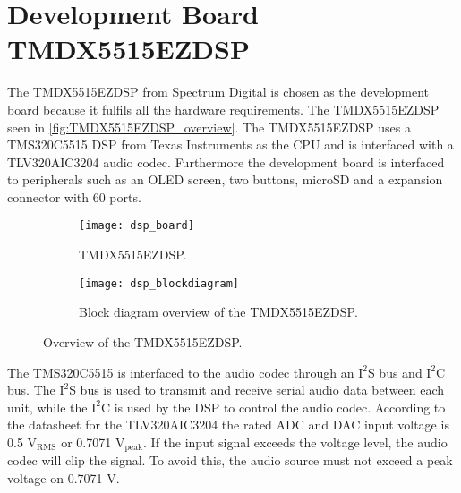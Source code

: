 \section{Development Board TMDX5515EZDSP}

The TMDX5515EZDSP from Spectrum Digital is chosen as the development board because it fulfils all the hardware requirements. The TMDX5515EZDSP seen in \autoref{fig:TMDX5515EZDSP_overview}. The TMDX5515EZDSP uses a TMS320C5515 DSP from Texas Instruments as the CPU and is interfaced with a TLV320AIC3204 audio codec. Furthermore the development board is interfaced to peripherals such as an OLED screen, two buttons, microSD and a expansion connector with 60 ports. 

\begin{figure}[H]
\centering
\begin{subfigure}[t]{0.47\textwidth}
\texttt{[image: dsp\_board]}
	\caption{TMDX5515EZDSP.}
	\label{fig:TMDX5515EZDSP}
\end{subfigure}
\hspace{6mm} 
\begin{subfigure}[t]{0.35\textwidth}
\texttt{[image: dsp\_blockdiagram]}
	\caption{Block diagram overview of the TMDX5515EZDSP.}
	\label{fig:TMDX5515EZDSP_blockdiagram}
\end{subfigure}
\caption{Overview of the TMDX5515EZDSP.}
\label{fig:TMDX5515EZDSP_overview}
\end{figure}

The TMS320C5515 is interfaced to the audio codec through an $\text{I}^2$S bus and $\text{I}^2$C bus. The $\text{I}^2$S bus is used to transmit and receive serial audio data between each unit, while the $\text{I}^2$C is used by the DSP to control the audio codec. According to the datasheet for the TLV320AIC3204 the rated ADC and DAC input voltage is 0.5 $\text{V}_\text{RMS}$ or 0.7071 $\text{V}_\text{peak}$. If the input signal exceeds the voltage level, the audio codec will clip the signal. To avoid this, the audio source must not exceed a peak voltage on 0.7071 V.















